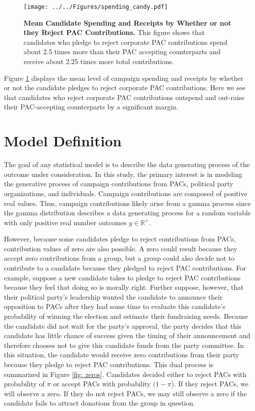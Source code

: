 \documentclass[12pt]{article}
\begin{document}
\begin{figure}[ht]
    \centering
    \texttt{[image: ../../Figures/spending\_candy.pdf]}
    \caption{\textbf{Mean Candidate Spending and Receipts by Whether or not they Reject PAC Contributions.} This figure shows that candidates who pledge to reject corporate PAC contributions spend about 2.5 times more than their PAC accepting counterparts and receive about 2.25 times more total contributions.}
    \label{fig: spending}
\end{figure}

Figure \ref{fig: spending} displays the mean level of campaign spending and receipts by whether or not the candidate pledges to reject corporate PAC contributions. Here we see that candidates who reject corporate PAC contributions outspend and out-raise their PAC-accepting counterparts by a significant margin.


\section{Model Definition}

The goal of any statistical model is to describe the data generating process of the outcome under consideration. In this study, the primary interest is in modeling the generative process of campaign contributions from PACs, political party organizations, and individuals. Campaign contributions are composed of positive real values. Thus, campaign contributions likely arise from a gamma process since the gamma distribution describes a data generating process for a random variable with only positive real number outcomes $y \in  \mathbb{R}^+$. 

However, because some candidates pledge to reject contributions from PACs, contribution values of zero are also possible. A zero could result because they accept zero contributions from a group, but a group could also decide not to contribute to a candidate because they pledged to reject PAC contributions. For example, suppose a new candidate takes to pledge to reject PAC contributions because they feel that doing so is morally right. Further suppose, however, that their political party's leadership wanted the candidate to announce their opposition to PACs after they had some time to evaluate this candidate's probability of winning the election and estimate their fundraising needs. Because the candidate did not wait for the party's approval, the party decides that this candidate has little chance of success given the timing of their announcement and therefore chooses not to give this candidate funds from the party committee. In this situation, the candidate would receive zero contributions from their party because they pledge to reject PAC contributions. This dual process is summarized in Figure \ref{fig: zeros}. Candidates decided either to reject PACs with probability of $\pi$ or accept PACs with probability $(1 - \pi$). If they reject PACs, we will observe a zero. If they do not reject PACs, we may still observe a zero if the candidate fails to attract donations from the group in question. 
\end{document}
